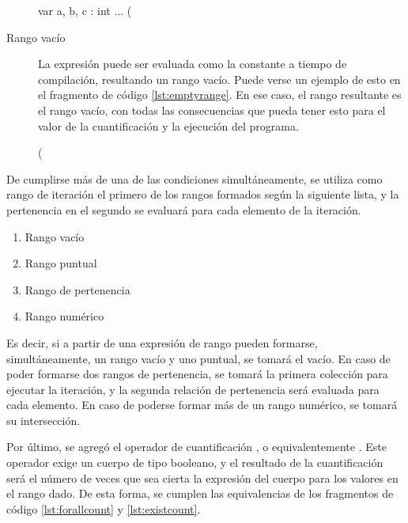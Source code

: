 \begin{description}
\begin{gracielacode}[caption=Cuantificación con rango puntual, label=lst:pointrange]
var a, b, c : int
...
(%
\end{gracielacode}

  \item [Rango vacío] La expresión puede ser evaluada como la constante
   a tiempo de compilación, resultando un rango vacío. Puede verse
  un ejemplo de esto en el fragmento de código \ref{lst:emptyrange}. En ese
  caso, el rango resultante es el rango vacío, con todas las consecuencias que
  pueda tener esto para el valor de la cuantificación y la ejecución del
  programa.

\begin{gracielacode}[caption=Cuantificación con rango puntual, label=lst:emptyrange]
(%
\end{gracielacode}

\end{description}

De cumplirse más de una de las condiciones simultáneamente, se utiliza como
rango de iteración el primero de los rangos formados según la siguiente lista, y
la pertenencia en el segundo se evaluará para cada elemento de la iteración.

\begin{enumerate}
  \item Rango vacío
  \item Rango puntual
  \item Rango de pertenencia
  \item Rango numérico
\end{enumerate}

Es decir, si a partir de una expresión de rango pueden formarse,
simultáneamente, un rango vacío y uno puntual, se tomará el vacío. En caso de
poder formarse dos rangos de pertenencia, se tomará la primera colección para
ejecutar la iteración, y la segunda relación de pertenencia será evaluada para
cada elemento. En caso de poderse formar más de un rango numérico, se tomará su
intersección.

Por último, se agregó el operador de cuantificación , o
equivalentemente \ingra{#}. Este operador exige un cuerpo de tipo booleano, y el
resultado de la cuantificación será el número de veces que sea cierta la
expresión del cuerpo para los valores en el rango dado. De esta forma, se
cumplen las equivalencias de los fragmentos de código \ref{lst:forallcount} y
\ref{lst:existcount}.

